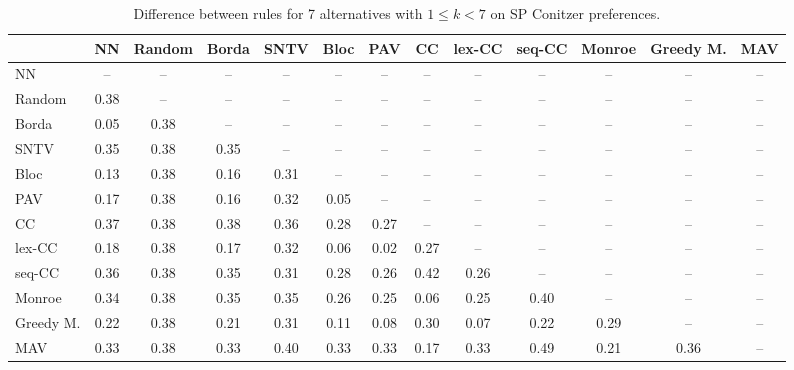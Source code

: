 
\begin{table*}[htbp]
\centering
\begin{tabular}{lcccccccccccc}
\toprule
 & NN & Random & Borda & SNTV & Bloc & PAV & CC & lex-CC & seq-CC & Monroe & Greedy M. & MAV \\
\midrule
NN & -- & -- & -- & -- & -- & -- & -- & -- & -- & -- & -- & -- \\
Random & \cellcolor{blue!38} 0.38 & -- & -- & -- & -- & -- & -- & -- & -- & -- & -- & -- \\
Borda & \cellcolor{blue!5} 0.05 & \cellcolor{blue!38} 0.38 & -- & -- & -- & -- & -- & -- & -- & -- & -- & -- \\
SNTV & \cellcolor{blue!35} 0.35 & \cellcolor{blue!38} 0.38 & \cellcolor{blue!35} 0.35 & -- & -- & -- & -- & -- & -- & -- & -- & -- \\
Bloc & \cellcolor{blue!13} 0.13 & \cellcolor{blue!38} 0.38 & \cellcolor{blue!16} 0.16 & \cellcolor{blue!31} 0.31 & -- & -- & -- & -- & -- & -- & -- & -- \\
PAV & \cellcolor{blue!17} 0.17 & \cellcolor{blue!38} 0.38 & \cellcolor{blue!16} 0.16 & \cellcolor{blue!32} 0.32 & \cellcolor{blue!5} 0.05 & -- & -- & -- & -- & -- & -- & -- \\
CC & \cellcolor{blue!37} 0.37 & \cellcolor{blue!38} 0.38 & \cellcolor{blue!38} 0.38 & \cellcolor{blue!36} 0.36 & \cellcolor{blue!28} 0.28 & \cellcolor{blue!27} 0.27 & -- & -- & -- & -- & -- & -- \\
lex-CC & \cellcolor{blue!18} 0.18 & \cellcolor{blue!38} 0.38 & \cellcolor{blue!17} 0.17 & \cellcolor{blue!32} 0.32 & \cellcolor{blue!6} 0.06 & \cellcolor{blue!2} 0.02 & \cellcolor{blue!27} 0.27 & -- & -- & -- & -- & -- \\
seq-CC & \cellcolor{blue!36} 0.36 & \cellcolor{blue!38} 0.38 & \cellcolor{blue!35} 0.35 & \cellcolor{blue!31} 0.31 & \cellcolor{blue!28} 0.28 & \cellcolor{blue!26} 0.26 & \cellcolor{blue!42} 0.42 & \cellcolor{blue!26} 0.26 & -- & -- & -- & -- \\
Monroe & \cellcolor{blue!34} 0.34 & \cellcolor{blue!38} 0.38 & \cellcolor{blue!35} 0.35 & \cellcolor{blue!35} 0.35 & \cellcolor{blue!26} 0.26 & \cellcolor{blue!25} 0.25 & \cellcolor{blue!6} 0.06 & \cellcolor{blue!25} 0.25 & \cellcolor{blue!40} 0.40 & -- & -- & -- \\
Greedy M. & \cellcolor{blue!22} 0.22 & \cellcolor{blue!38} 0.38 & \cellcolor{blue!21} 0.21 & \cellcolor{blue!31} 0.31 & \cellcolor{blue!11} 0.11 & \cellcolor{blue!8} 0.08 & \cellcolor{blue!30} 0.30 & \cellcolor{blue!7} 0.07 & \cellcolor{blue!22} 0.22 & \cellcolor{blue!28} 0.29 & -- & -- \\
MAV & \cellcolor{blue!33} 0.33 & \cellcolor{blue!38} 0.38 & \cellcolor{blue!33} 0.33 & \cellcolor{blue!40} 0.40 & \cellcolor{blue!33} 0.33 & \cellcolor{blue!33} 0.33 & \cellcolor{blue!17} 0.17 & \cellcolor{blue!33} 0.33 & \cellcolor{blue!49} 0.49 & \cellcolor{blue!21} 0.21 & \cellcolor{blue!36} 0.36 & -- \\
\bottomrule
\end{tabular}

\caption{Difference between rules for 7 alternatives with $1 \leq k < 7$ on SP Conitzer preferences.}
\label{tab:rule_distance_heatmap-m=[7]-pref_dist=single_peaked_conitzer}
\end{table*}
    